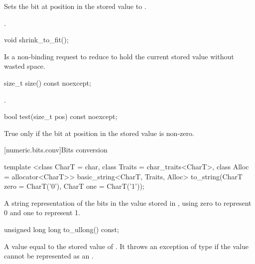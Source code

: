\begin{addedblock}
\begin{itemdescr}
\effects Sets the bit at position  in the stored value to .

\returns {}.
\end{itemdescr}

\begin{itemdecl}
void shrink_to_fit();	
\end{itemdecl}

\begin{itemdescr}
\effects Is a non-binding request to reduce  to hold the current stored value without wasted space.
\end{itemdescr}

\begin{itemdecl}
size_t size() const noexcept;	
\end{itemdecl}

\begin{itemdescr}
\returns {}.
\end{itemdescr}

\begin{itemdecl}
bool test(size_t pos) const noexcept;	
\end{itemdecl}

\begin{itemdescr}
\returns True only if the bit at position  in the stored value is non-zero.
\end{itemdescr}

[numeric.bits.conv]{Bits conversion}

\begin{itemdecl}
template <class CharT = char, class Traits = char_traits<CharT>, class Alloc = allocator<CharT>>
  basic_string<CharT, Traits, Alloc> to_string(CharT zero = CharT('0'),
                                               CharT one = CharT('1'));	
\end{itemdecl}

\begin{itemdescr}
\returns A string representation of the bits in the value stored in , using zero to represent 0 and one to represent 1.	
\end{itemdescr}

\begin{itemdecl}
unsigned long long to_ullong() const;	
\end{itemdecl}

\begin{itemdescr}
\returns A value equal to the stored value of . It throws an exception of type  if the value cannot be represented as an .	
\end{itemdescr}


\end{addedblock}
